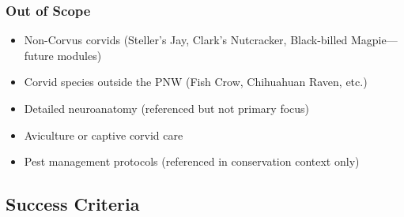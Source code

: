 \documentclass[11pt,letterpaper]{article}
\begin{document}
\subsubsection{Out of Scope}
\begin{itemize}[leftmargin=2em]
  \item Non-Corvus corvids (Steller's Jay, Clark's Nutcracker, Black-billed Magpie---future modules)
  \item Corvid species outside the PNW (Fish Crow, Chihuahuan Raven, etc.)
  \item Detailed neuroanatomy (referenced but not primary focus)
  \item Aviculture or captive corvid care
  \item Pest management protocols (referenced in conservation context only)
\end{itemize}

\subsection{Success Criteria}
\end{document}
